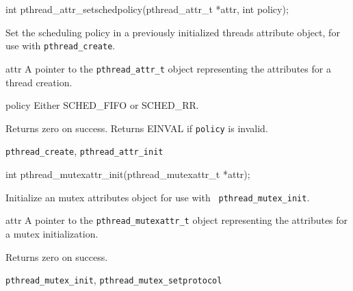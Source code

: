 \begin{apisyn}

	\funcproto int pthread_attr_setschedpolicy(pthread_attr_t *attr,
                                                   int policy);
\end{apisyn}
\begin{apidesc}
	Set the scheduling policy in a previously initialized threads
	attribute object, for use with {\tt pthread_create}. 
\end{apidesc}
\begin{apiparm}
	\item[attr]
		A pointer to the {\tt pthread_attr_t} object
		representing the attributes for a thread creation.
	\item[policy]
		Either SCHED_FIFO or SCHED_RR.
\end{apiparm}
\begin{apiret}
	Returns zero on success. Returns EINVAL if {\tt policy} is 
	invalid.
\end{apiret}
\begin{apirel}
	{\tt pthread_create}, {\tt pthread_attr_init}
\end{apirel}


\begin{apisyn}

	\funcproto int pthread_mutexattr_init(pthread_mutexattr_t *attr);
\end{apisyn}
\begin{apidesc}
	Initialize an mutex attributes object for use with {\tt
	pthread_mutex_init}. 
\end{apidesc}
\begin{apiparm}
	\item[attr]
		A pointer to the {\tt pthread_mutexattr_t} object
		representing the attributes for a mutex initialization.
\end{apiparm}
\begin{apiret}
	Returns zero on success.
\end{apiret}
\begin{apirel}
	{\tt pthread_mutex_init}, {\tt pthread_mutex_setprotocol}
\end{apirel}


